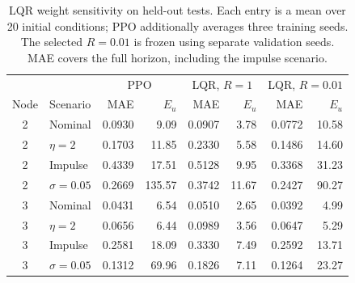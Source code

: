 \begin{table}[pos=htbp,width=\linewidth]
\centering
\small
\setlength{\tabcolsep}{3pt}
\caption{LQR weight sensitivity on held-out tests. Each entry is a mean over 20 initial conditions; PPO additionally averages three training seeds. The selected $R=0.01$ is frozen using separate validation seeds. MAE covers the full horizon, including the impulse scenario.}
\label{tab:lqr_weight_sensitivity}
\begin{tabular}{@{}clrrrrrr@{}}
\toprule
 & & \multicolumn{2}{c}{PPO} & \multicolumn{2}{c}{LQR, $R=1$} & \multicolumn{2}{c}{LQR, $R=0.01$} \\
Node & Scenario & MAE & $E_u$ & MAE & $E_u$ & MAE & $E_u$ \\
\midrule
2 & Nominal & 0.0930 & 9.09 & 0.0907 & 3.78 & 0.0772 & 10.58 \\
2 & $\eta=2$ & 0.1703 & 11.85 & 0.2330 & 5.58 & 0.1486 & 14.60 \\
2 & Impulse & 0.4339 & 17.51 & 0.5128 & 9.95 & 0.3368 & 31.23 \\
2 & $\sigma=0.05$ & 0.2669 & 135.57 & 0.3742 & 11.67 & 0.2427 & 90.27 \\
\midrule
3 & Nominal & 0.0431 & 6.54 & 0.0510 & 2.65 & 0.0392 & 4.99 \\
3 & $\eta=2$ & 0.0656 & 6.44 & 0.0989 & 3.56 & 0.0647 & 5.29 \\
3 & Impulse & 0.2581 & 18.09 & 0.3330 & 7.49 & 0.2592 & 13.71 \\
3 & $\sigma=0.05$ & 0.1312 & 69.96 & 0.1826 & 7.11 & 0.1264 & 23.27 \\
\bottomrule
\end{tabular}
\end{table}
